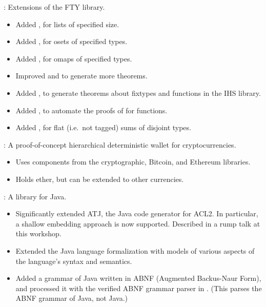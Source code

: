 \begin{frame}

\implibtitle

:
Extensions of the FTY library.
\begin{itemize}
\item
Added , for lists of specified size.
\item
Added , for osets of specified types.
\item
Added , for omaps of specified types.
\item
Improved  and  to generate more theorems.
\item
Added ,
to generate theorems about  fixtypes
and functions in the IHS library.
\item
Added ,
to automate the proofs of  for  functions.
\item
Added ,
for flat (i.e.\ not tagged) sums of disjoint types.
\end{itemize}

\end{frame}


\begin{frame}

\implibtitle

:
A proof-of-concept hierarchical deterministic wallet for cryptocurrencies.
\begin{itemize}
\item
Uses components from the cryptographic, Bitcoin, and Ethereum libraries.
\item
Holds ether, but can be extended to other currencies.
\end{itemize}

\end{frame}


\begin{frame}

\implibtitle

:
A library for Java.
\begin{itemize}
\item
Significantly extended ATJ, the Java code generator for ACL2.
In particular, a shallow embedding approach is now supported.
Described in a rump talk at this workshop.
\item
Extended the Java language formalization with models of
various aspects of the language's syntax and semantics.
\item
Added a grammar of Java written in ABNF (Augmented Backus-Naur Form),
and processed it with the verified ABNF grammar parser in .
(This parses the ABNF grammar of Java, not Java.)
\end{itemize}

\end{frame}

